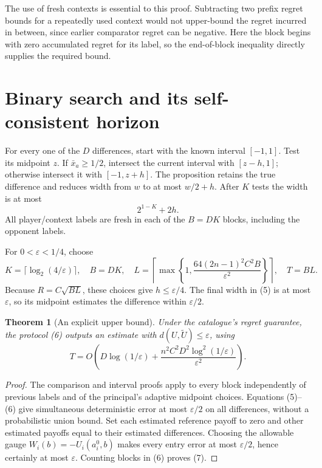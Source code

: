 \documentclass[11pt,a4paper]{article}
\newtheorem{theorem}{Theorem}[section]
\begin{document}
The use of fresh contexts is essential to this proof. Subtracting two prefix regret bounds for a repeatedly used context would not upper-bound the regret incurred in between, since earlier comparator regret can be negative. Here the block begins with zero accumulated regret for its label, so the end-of-block inequality directly supplies the required bound.

\section{Binary search and its self-consistent horizon}
For every one of the $D$ differences, start with the known interval $[-1,1]$. Test its midpoint $z$. If $\bar x_a\ge1/2$, intersect the current interval with $[z-h,1]$; otherwise intersect it with $[-1,z+h]$. The proposition retains the true difference and reduces width from $w$ to at most $w/2+h$. After $K$ tests the width is at most
\[
 2^{1-K}+2h.                                             \tag{5}
\]
All player/context labels are fresh in each of the $B=DK$ blocks, including the opponent labels.

For $0<\varepsilon<1/4$, choose
\[
 K=\lceil\log_2(4/\varepsilon)\rceil,\quad B=DK,\quad
 L=\left\lceil\max\left\{1,
 \frac{64(2n-1)^2C^2B}{\varepsilon^2}\right\}\right\rceil,
 \quad T=BL.                                            \tag{6}
\]
Because $R=C\sqrt{BL}$, these choices give $h\le\varepsilon/4$. The final width in (5) is at most $\varepsilon$, so its midpoint estimates the difference within $\varepsilon/2$.

\begin{theorem}[An explicit upper bound]
Under the catalogue's regret guarantee, the protocol (6) outputs an estimate with $d(U,\widetilde U)\le\varepsilon$, using
\[
 T=O\left(D\log(1/\varepsilon)+
 \frac{n^2C^2D^2\log^2(1/\varepsilon)}{\varepsilon^2}\right).
                                                               \tag{7}
\]
\end{theorem}
\begin{proof}
The comparison and interval proofs apply to every block independently of previous labels and of the principal's adaptive midpoint choices. Equations (5)--(6) give simultaneous deterministic error at most $\varepsilon/2$ on all differences, without a probabilistic union bound. Set each estimated reference payoff to zero and other estimated payoffs equal to their estimated differences. Choosing the allowable gauge $W_i(b)=-U_i(a_i^0,b)$ makes every entry error at most $\varepsilon/2$, hence certainly at most $\varepsilon$. Counting blocks in (6) proves (7).
\end{proof}
\end{document}
